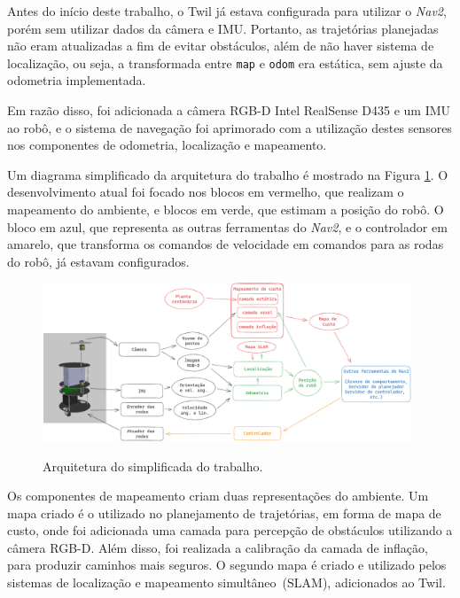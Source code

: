 \documentclass[repeatfields,xlists,xpacks,oneside,yearsonly]{ufrgscca}
\begin{document}
Antes do início deste trabalho, o Twil já estava configurada para
utilizar o \textit{Nav2}, porém sem utilizar dados da câmera e IMU.
Portanto, as trajetórias planejadas não eram atualizadas a fim de
evitar obstáculos, além de não haver sistema de localização, ou seja,
a transformada entre \texttt{map} e \texttt{odom} era estática, sem
ajuste da odometria implementada.

Em razão disso, foi adicionada a câmera RGB-D Intel RealSense D435 e
um IMU ao robô, e o sistema de navegação foi aprimorado com a
utilização destes sensores nos componentes de odometria, localização
e mapeamento.

Um diagrama simplificado da arquitetura do trabalho é mostrado na
Figura \ref{fig:arq_trabalho}. O desenvolvimento atual foi focado nos
blocos em vermelho, que realizam o mapeamento do ambiente, e blocos
em verde, que estimam a posição do robô. O bloco em azul, que
representa as outras ferramentas do \textit{Nav2}, e o controlador em
amarelo, que transforma os comandos de velocidade em comandos para as
rodas do robô, já estavam configurados.

\begin{figure}[h]
    {
        \centering
        \caption{Arquitetura do simplificada do trabalho.}
        \label{fig:arq_trabalho}
        \includegraphics[width=0.98\textwidth]{arquitetura_simplificadav3.png}\\
    }
\end{figure}

Os componentes de mapeamento criam duas representações do ambiente.
Um mapa criado é o utilizado no planejamento de trajetórias, em forma
de mapa de custo, onde foi adicionada uma camada para percepção de
obstáculos utilizando a câmera RGB-D. Além disso, foi realizada a
calibração da camada de inflação, para produzir caminhos mais
seguros. O segundo mapa é criado e utilizado pelos sistemas de
localização e mapeamento simultâneo~(SLAM), adicionados ao Twil.
\end{document}

